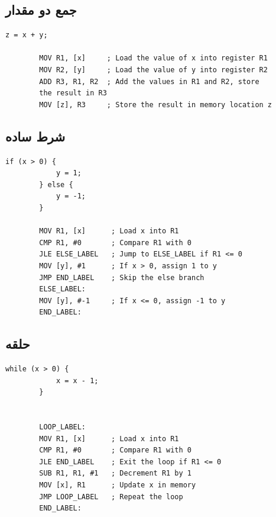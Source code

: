 \documentclass[12pt, a4paper]{report}
\begin{document}
\subsection{جمع دو مقدار}
\begin{LTR} %
	\begin{lstlisting}[breaklines=true]
		z = x + y;
		
		MOV R1, [x]     ; Load the value of x into register R1
		MOV R2, [y]     ; Load the value of y into register R2
		ADD R3, R1, R2  ; Add the values in R1 and R2, store 
		the result in R3
		MOV [z], R3     ; Store the result in memory location z
	\end{lstlisting}
\end{LTR}

\subsection{شرط ساده }
\begin{LTR} %
	\begin{lstlisting}[breaklines=true]
		if (x > 0) {
			y = 1;
		} else {
			y = -1;
		}
		
		MOV R1, [x]      ; Load x into R1
		CMP R1, #0       ; Compare R1 with 0
		JLE ELSE_LABEL   ; Jump to ELSE_LABEL if R1 <= 0
		MOV [y], #1      ; If x > 0, assign 1 to y
		JMP END_LABEL    ; Skip the else branch
		ELSE_LABEL:
		MOV [y], #-1     ; If x <= 0, assign -1 to y
		END_LABEL:
	\end{lstlisting}
\end{LTR}


\subsection{حلقه }
\begin{LTR} %
	\begin{lstlisting}[breaklines=true]
		while (x > 0) {
			x = x - 1;
		}
		
		
		LOOP_LABEL:
		MOV R1, [x]      ; Load x into R1
		CMP R1, #0       ; Compare R1 with 0
		JLE END_LABEL    ; Exit the loop if R1 <= 0
		SUB R1, R1, #1   ; Decrement R1 by 1
		MOV [x], R1      ; Update x in memory
		JMP LOOP_LABEL   ; Repeat the loop
		END_LABEL:
	\end{lstlisting}
\end{LTR}
\end{document}
